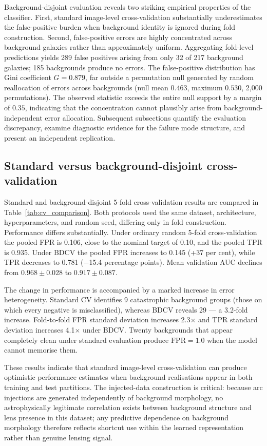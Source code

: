 \documentclass[fleqn,usenatbib]{mnras}
\begin{document}
Background-disjoint evaluation reveals two striking empirical properties
of the classifier. First, standard
image-level cross-validation substantially underestimates the
false-positive burden when background identity is ignored during fold
construction. Second, false-positive errors are highly concentrated
across background galaxies rather than approximately uniform. Aggregating
fold-level predictions yields 289 false positives arising from only 32
of 217 background galaxies; 185 backgrounds produce no errors. The
false-positive distribution has Gini coefficient $G = 0.879$, far
outside a permutation null generated by random reallocation of errors
across backgrounds (null mean $0.463$, maximum $0.530$, 2,000
permutations). The observed statistic exceeds the entire null support by
a margin of $0.35$, indicating that the concentration cannot plausibly
arise from background-independent error allocation. Subsequent
subsections quantify the evaluation discrepancy, examine diagnostic
evidence for the failure mode structure, and present an independent
replication.

\subsection{Standard versus background-disjoint cross-validation}
\label{sec:cv_results}

Standard and background-disjoint 5-fold cross-validation results are
compared in Table~\ref{tab:cv_comparison}. Both protocols used the same
dataset, architecture, hyperparameters, and random seed, differing only
in fold construction. Performance differs substantially. Under ordinary
random 5-fold cross-validation the pooled FPR is 0.106, close to the
nominal target of 0.10, and the pooled TPR is 0.935. Under BDCV the
pooled FPR increases to 0.145 (+37 per cent), while TPR decreases to
0.781 ($-$15.4 percentage points). Mean validation AUC declines from
$0.968 \pm 0.028$ to $0.917 \pm 0.087$.

The change in performance is accompanied by a marked increase in error
heterogeneity. Standard CV identifies 9 catastrophic background groups
(those on which every negative is misclassified), whereas BDCV reveals
29 --- a 3.2-fold increase. Fold-to-fold FPR standard deviation
increases 2.3$\times$ and TPR standard deviation increases 4.1$\times$
under BDCV. Twenty backgrounds that appear completely clean under
standard evaluation produce $\mathrm{FPR} = 1.0$ when the model cannot
memorise them.

These results indicate that standard image-level cross-validation can
produce optimistic performance estimates when background realisations
appear in both training and test partitions. The injected-data
construction is critical: because arc injections are generated
independently of background morphology, no astrophysically legitimate
correlation exists between background structure and lens presence in this
dataset; any predictive dependence on background morphology therefore
reflects shortcut use within the learned representation rather than
genuine lensing signal.
\end{document}

